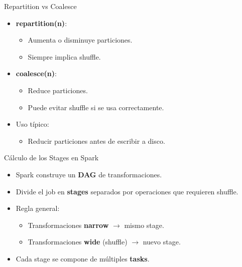 \documentclass{beamer}
\begin{document}
\begin{frame}{Repartition vs Coalesce}
\begin{itemize}
  \item \textbf{repartition(n)}:
  \begin{itemize}
    \item Aumenta o disminuye particiones.
    \item Siempre implica shuffle.
  \end{itemize}
  \item \textbf{coalesce(n)}:
  \begin{itemize}
    \item Reduce particiones.
    \item Puede evitar shuffle si se usa correctamente.
  \end{itemize}
  \item Uso típico:
  \begin{itemize}
    \item Reducir particiones antes de escribir a disco.
  \end{itemize}
\end{itemize}
\end{frame}

\begin{frame}{Cálculo de los Stages en Spark}
\begin{itemize}
  \item Spark construye un \textbf{DAG} de transformaciones.
  \item Divide el job en \textbf{stages} separados por operaciones que requieren shuffle.
  \item Regla general:
  \begin{itemize}
    \item Transformaciones \textbf{narrow} $\rightarrow$ mismo stage.
    \item Transformaciones \textbf{wide} (shuffle) $\rightarrow$ nuevo stage.
  \end{itemize}
  \item Cada stage se compone de múltiples \textbf{tasks}.
\end{itemize}
\end{frame}
\end{document}

